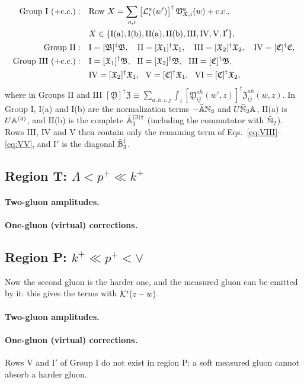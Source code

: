 \begin{align}
\text{Group I }(+{\rm c.c.}):&\quad \text{Row }X=\sum_{a,i}\big[\mathcal L^a_i(w')\big]^\dagger\,\mathfrak V^a_{X,i}(w)+{\rm c.c.},\notag\\
&\quad X\in\{{\rm I(a),I(b),II(a),II(b),III,IV,V,I}'\},\notag\\
\text{Group II}:&\quad \text{I}=[\mathfrak B]^\dagger\mathfrak B,\quad \text{II}=[\mathfrak X_1]^\dagger\mathfrak X_1,\quad \text{III}=[\mathfrak X_2]^\dagger\mathfrak X_2,\quad \text{IV}=[\mathfrak C]^\dagger\mathfrak C,\notag\\
\text{Group III }(+{\rm c.c.}):&\quad \text{I}=[\mathfrak X_1]^\dagger\mathfrak B,\ \ \text{II}=[\mathfrak X_2]^\dagger\mathfrak B,\ \ \text{III}=[\mathfrak C]^\dagger\mathfrak B,\notag\\
&\quad\text{IV}=[\mathfrak X_2]^\dagger\mathfrak X_1,\ \ \text{V}=[\mathfrak C]^\dagger\mathfrak X_1,\ \ \text{VI}=[\mathfrak C]^\dagger\mathfrak X_2,
\end{align}
where in Groups II and III $[\mathfrak Y]^\dagger\mathfrak Z\equiv\sum_{a,h,i,j}\int_z[\mathfrak Y^{ah}_{ij}(w',z)]^\dagger\mathfrak Z^{ah}_{ij}(w,z)$. In Group I, I(a) and I(b) are the normalization terms $-\bar{\mathbb{A}}\mathbb{N}_2$ and $U\bar{\mathbb{N}}_2\mathbb{A}$, II(a) is $U\mathbb{A}^{(3)}$, and II(b) is the complete $\bar{\mathbb{A}}^{(3)\dagger}_1$ (including the commutator with $\bar{\mathbb{N}}_2$). Rows III, IV and V then contain only the remaining term of Eqs.~\eqref{eq:VIII}--\eqref{eq:VV}, and I$'$ is the diagonal $\bar{\mathbb{B}}_3^\dagger$.

\subsection{Region T: \texorpdfstring{$\Lambda<p^+\ll k^+$}{Lambda<p+<<k+}}
\paragraph*{Two-gluon amplitudes.}
{\small

}
\paragraph*{One-gluon (virtual) corrections.}
{\small

}

\subsection{Region P: \texorpdfstring{$k^+\ll p^+<\vee$}{k+<<p+<vee}}
Now the second gluon is the harder one, and the measured gluon can be emitted by it: this gives the terms with $\mathcal{K}^i(z-w)$.
\paragraph*{Two-gluon amplitudes.}
{\small

}
\paragraph*{One-gluon (virtual) corrections.}
{\small

}
Rows V and I$'$ of Group I do not exist in region P: a soft measured gluon cannot absorb a harder gluon.
